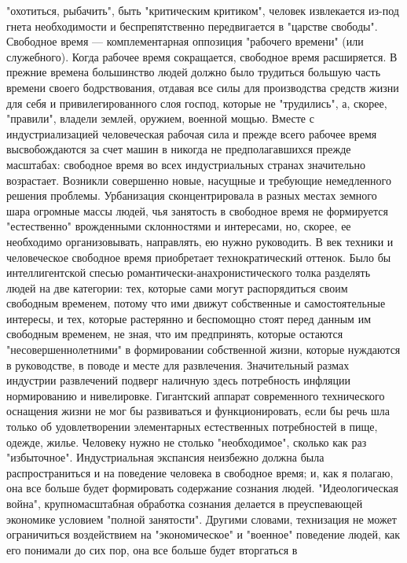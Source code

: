 \documentclass[12pt]{article}
\begin{document}
"охотиться,  рыбачить",  быть  "критическим  критиком",  человек  извлекается  из-под  гнета  необходимости  и
беспрепятственно  передвигается  в  "царстве  свободы".  Свободное  время  ---  комплементарная  оппозиция
"рабочего времени" (или служебного). Когда рабочее время сокращается, свободное время расширяется. В
прежние времена большинство людей должно было трудиться большую часть времени своего бодрствования,
отдавая все силы для производства средств жизни для себя и
привилегированного  слоя  господ,  которые  не  "трудились",  а,  скорее,  "правили",  владели  землей,  оружием,
военной мощью. Вместе с
индустриализацией человеческая рабочая сила и прежде всего рабочее время высвобождаются за счет машин в
никогда  не  предполагавшихся  прежде  масштабах:  свободное  время  во  всех  индустриальных  странах
значительно  возрастает.  Возникли  совершенно  новые,  насущные  и  требующие  немедленного  решения
проблемы. Урбанизация сконцентрировала в разных местах земного шара огромные массы людей, чья занятость
в свободное время не формируется "естественно" врожденными склонностями и интересами, но, скорее, ее
необходимо организовывать, направлять, ею нужно руководить. В век техники и человеческое свободное время
приобретает технократический оттенок. Было бы интеллигентской спесью романтически-анахронистического
толка разделять людей на две категории: тех, которые сами могут распорядиться своим свободным временем,
потому что ими движут собственные и самостоятельные интересы, и тех, которые растерянно и беспомощно
стоят перед данным им свободным временем, не зная, что им предпринять, которые остаются
"несовершеннолетними" в формировании собственной жизни, которые нуждаются в руководстве, в поводе и
месте для развлечения. Значительный размах индустрии развлечений подверг наличную здесь потребность
инфляции нормированию и нивелировке. Гигантский аппарат современного технического оснащения жизни не
мог  бы  развиваться  и  функционировать,  если  бы  речь  шла  только  об  удовлетворении  элементарных
естественных потребностей в пище, одежде, жилье. Человеку нужно не столько "необходимое", сколько как раз
"избыточное". Индустриальная экспансия неизбежно должна была распространиться и на поведение человека в
свободное время; и, как я полагаю, она все больше будет формировать содержание сознания людей.
"Идеологическая  война",  крупномасштабная  обработка  сознания  делается  в  преуспевающей  экономике
условием  "полной  занятости".  Другими  словами,  технизация  не  может  ограничиться  воздействием  на
"экономическое" и "военное" поведение людей, как его понимали до сих пор, она все больше будет вторгаться в
\end{document}
